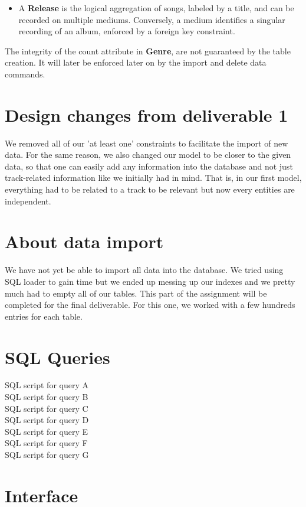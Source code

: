 \documentclass{article}
\begin{document}
{\begin{itemize}
  \item A \textbf{Release} is the logical aggregation of songs, labeled by a title, and can be recorded on multiple mediums. 
  Conversely, a medium identifies a singular recording of an album, enforced by a foreign key constraint.
\end{itemize}

The integrity of the count attribute in \textbf{Genre}, are not guaranteed by the table creation. It will
later be enforced later on by the import and delete data commands.

}

\section*{Design changes from deliverable 1}
We removed all of our 'at least one' constraints to facilitate the import of new data. For the same reason, we also changed our model to be closer to the given data, so that 
one can easily add any information into the database and not just track-related information like we initially had in mind. That is, in our first model, everything 
had to be related to a track to be relevant but now every entities are independent. 

\section*{About data import}
We have not yet be able to import all data into the database. We tried using SQL loader to gain time but we ended
up messing up our indexes and we pretty much had to empty all of our tables. 
This part of the assignment will be completed for the final deliverable. For this one, we worked with a few hundreds entries
for each table. 

\section*{SQL Queries}
{SQL script for query A} \\
{SQL script for query B} \\
{SQL script for query C} \\
{SQL script for query D} \\
{SQL script for query E} \\
{SQL script for query F} \\
{SQL script for query G} \\

\section*{Interface}
\end{document}
